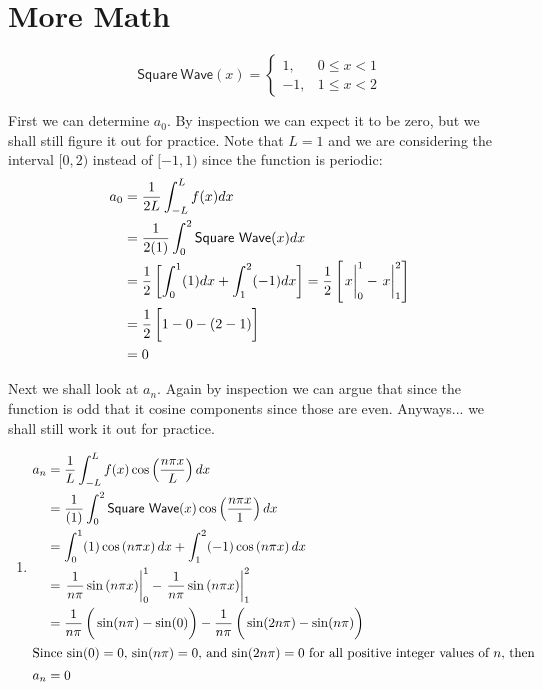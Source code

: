 \documentclass[11pt,letterpaper,twoside]{book}
\newenvironment{mathstuff}
   {\cbcolor{black}\par \vspace{8pt} \cbstart \vspace{-15pt} \begin{enumerate} \item[]}
   {\end{enumerate} \vspace{-5pt} \cbend \par \vspace{7pt} }
\begin{document}
\lipsum[13-14]

\section{More Math}

\lipsum[15]

\[
\mathsf{Square\ Wave}(x) = \left\{ 
      \begin{array}{ll} 1, & 0 \leq x < 1 \\ 
                       -1, & 1 \leq x < 2 \end{array} \right.
\]

First we can determine $a_0$.  By inspection we can expect it to be zero, but we shall still 
figure it out for practice.  Note that $L = 1$ and we are considering the interval $[0, 2)$ instead
of $[-1, 1)$ since the function is periodic:
\begin{align*}
a_0 &= \frac{1}{2L} \int_{-L}^L f(x) dx  \\
    &= \frac{1}{2(1)} \int_{0}^{2} \mathsf{Square\ Wave}(x) dx \\
    &= \frac{1}{2} \left[ \int_0^1 (1) dx + \int_1^2 (-1) dx \right] = \frac{1}{2} \left[ \left. \vphantom{\frac{1}{2}} x\right|^1_0 - \left. \vphantom{\frac{1}{2}} x\right|^2_1 \right] \\
    &= \frac{1}{2} \left[ \vphantom{\frac{1}{2}} 1 - 0 - (2 - 1) \right] \\
    &= 0
\end{align*}

Next we shall look at $a_n$.  Again by inspection we can argue that since the function is odd that it
cosine components since those are even.  Anyways... we shall still work it out for practice.
\begin{mathstuff}
\begin{align*}
a_n &= \frac{1}{L}  \int_{-L}^L f(x) \cos \left( \frac{n\pi x}{L} \right) dx \\
    &= \frac{1}{(1)} \int_{0}^{2} \mathsf{Square\ Wave}(x)\cos \left( \frac{n\pi x}{1} \right) dx \\ 
    &= \int_0^1 (1) \cos \left( n\pi x \right) dx + \int_1^2 (-1) \cos \left( n\pi x \right) dx \\
    &= \left. \frac{1}{n \pi} \sin \left( n\pi x \right)\right|^1_0 -  \left. \frac{1}{n \pi} \sin \left( n\pi x \right)\right|^2_1 \\
    &= \frac{1}{n \pi} \left( \vphantom{\frac{1}{2}} \sin ( n\pi) - \sin(0) \right) - \frac{1}{n \pi} \left( \vphantom{\frac{1}{2}} \sin (2n\pi) - \sin(n\pi) \right) \\
\intertext{Since $\sin(0) = 0$, $\sin ( n\pi) = 0$, and $\sin (2n\pi) = 0$ for all positive integer values of $n$, then}
a_n &= 0
\end{align*}
\end{mathstuff}
\end{document}
